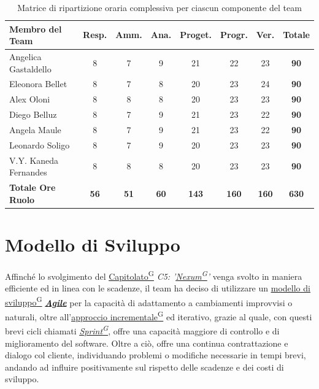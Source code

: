 \documentclass[a4paper,12pt]{article}
\providecommand{\glslink}[2]{\href{https://alittlebyte-19.github.io/Documentazione/glossario.html\#gls-#1}{\underline{#2}\textsuperscript{\scriptsize G}}}
\begin{document}
\begin{table}[H]
    \centering
    \renewcommand{\arraystretch}{1.5} 
    \begin{tabularx}{\textwidth}{|X|c|c|c|c|c|c|c|}
    \hline
    \textbf{Membro del Team} & \textbf{Resp.} & \textbf{Amm.} & \textbf{Ana.} & \textbf{Proget.} & \textbf{Progr.} & \textbf{Ver.} & \textbf{Totale} \\
    \hline
    Angelica Gastaldello & 8 & 7 & 9 & 21 & 22 & 23 & \textbf{90} \\
    \hline
    Eleonora Bellet & 8 & 7 & 8 & 20 & 23 & 24 & \textbf{90} \\
    \hline
    Alex Oloni & 8 & 8 & 8 & 20 & 23 & 23 & \textbf{90} \\
    \hline
    Diego Belluz & 8 & 7 & 9 & 21 & 23 & 22 & \textbf{90} \\
    \hline
    Angela Maule & 8 & 7 & 9 & 21 & 23 & 22 & \textbf{90} \\
    \hline
    Leonardo Soligo & 8 & 7 & 9 & 20 & 23 & 23 & \textbf{90} \\
    \hline
    V.Y. Kaneda Fernandes & 8 & 8 & 8 & 20 & 23 & 23 & \textbf{90} \\
    \hline
    \rowcolor{gray!20}
    \textbf{Totale Ore Ruolo} & \textbf{56} & \textbf{51} & \textbf{60} & \textbf{143} & \textbf{160} & \textbf{160} & \textbf{630} \\
    \hline
    \end{tabularx}
    \caption{Matrice di ripartizione oraria complessiva per ciascun componente del team}
    \label{tab:ripartizione_oraria_totale}
\end{table}
\newpage

\newpage

\section{Modello di Sviluppo}
\label{sec:modello_di_sviluppo}
Affinché lo svolgimento del \glslink{capitolato}{Capitolato} \textit{C5: '\glslink{nexum}{Nexum}'} venga svolto in maniera efficiente ed in linea con le scadenze, il team ha deciso
di utilizzare un \glslink{modello-di-sviluppo}{modello di sviluppo} \href{https://agilemanifesto.org/}{\textbf{\textit{Agile}}} per la capacità di adattamento a cambiamenti improvvisi o naturali, oltre all'\glslink{approccio-incrementale}{approccio incrementale} ed iterativo, grazie al quale, con questi brevi cicli chiamati \textit{\glslink{sprint}{Sprint}},
offre una capacità maggiore di controllo e di miglioramento del software. Oltre a ciò, offre una continua contrattazione e dialogo col cliente, individuando problemi o modifiche necessarie in tempi brevi,
andando ad influire positivamente sul rispetto delle scadenze e dei costi di sviluppo.
\end{document}
